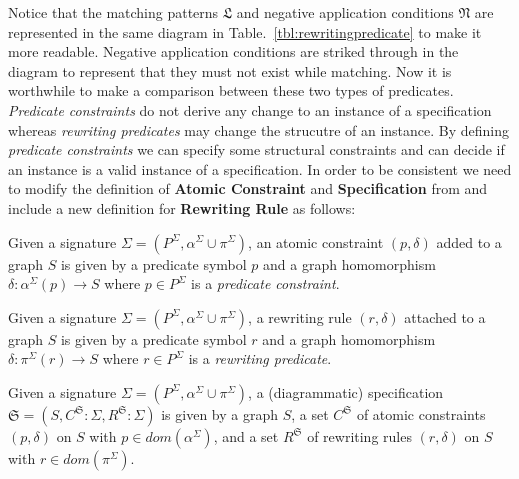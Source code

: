 \documentclass{eceasst}
\begin{document}
Notice that the matching patterns $\mathfrak{L} $ and negative application conditions $\mathfrak{N} $ are represented in the same diagram in 
Table.~\ref{tbl:rewritingpredicate} to make it more readable. Negative application conditions are striked through in the diagram to represent that they must not exist while matching. 
Now it is worthwhile to make a comparison between these two types of predicates. 
\textit{Predicate constraints} do not derive any change to an instance of a specification whereas \textit{rewriting predicates} may change the strucutre of an instance. 
By defining \textit{predicate constraints} we can specify some structural constraints and can decide if an instance is a valid instance of a specification. 
In order to be consistent we need to modify the definition of \textbf{Atomic Constraint} and \textbf{Specification} from \cite{Rutle10} and include a new definition for \textbf{Rewriting Rule} as follows:


\begin{definition}
 Given a signature $\Sigma = (P^\Sigma, \alpha^\Sigma \cup \pi^\Sigma)$, an atomic constraint $(p, \delta)$ added to a graph $S$ is given by a predicate symbol $p$ and a graph 
 homomorphism $\delta : \alpha^{\Sigma}(p) \rightarrow S$ where $p \in P^\Sigma$ is a \textit{predicate constraint}. 
\end{definition}



\begin{definition}
 Given a signature $\Sigma = (P^\Sigma, \alpha^\Sigma \cup \pi^\Sigma)$, a rewriting rule $(r, \delta)$ attached to a graph $S$ is given by a predicate symbol $r$ and a graph 
 homomorphism $\delta : \pi^{\Sigma}(r) \rightarrow S$ where $r \in P^\Sigma$ is a \textit{rewriting predicate}. 
\end{definition}


\begin{definition}[Specification]
 Given a signature $\Sigma = (P^\Sigma, \alpha^\Sigma \cup \pi^\Sigma)$, a (diagrammatic) specification $\mathfrak{S} = (S, C^{\mathfrak{S}}:\Sigma, R^{\mathfrak{S}}:\Sigma )$ 
 is given by 
 a graph $S$, 
 a set $C^\mathfrak{S}$ of atomic constraints $(p, \delta)$ on $S$ with $p \in dom(\alpha^\Sigma)$, and
 a set $R^\mathfrak{S}$ of rewriting rules $(r, \delta)$ on $S$ with $r \in dom(\pi^\Sigma)$. 

\end{definition}
\end{document}
